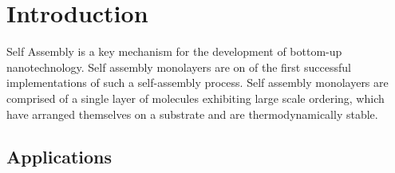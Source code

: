 \section{Introduction}

Self Assembly is a key mechanism for the development of bottom-up nanotechnology. Self assembly monolayers are on of the first successful implementations of such a self-assembly process. Self assembly monolayers are comprised of a single layer of molecules exhibiting large scale ordering, which have arranged themselves on a substrate and are thermodynamically stable.

\subsection{Applications}

